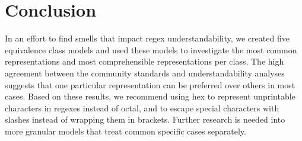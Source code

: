 
\section{Conclusion}
\label{sec:conclusion}
In an effort to find smells that impact regex understandability, we created five equivalence class models and used these models to investigate the most common representations and most comprehensible representations per class.  
 The high agreement between the community standards and understandability analyses  suggests that one particular representation can be preferred over others in most cases.  
Based on these results, we recommend using hex to represent unprintable characters in regexes instead of octal, and to escape special characters with slashes instead of wrapping them in brackets.  
Further research is needed into more granular models that treat common specific cases separately.
